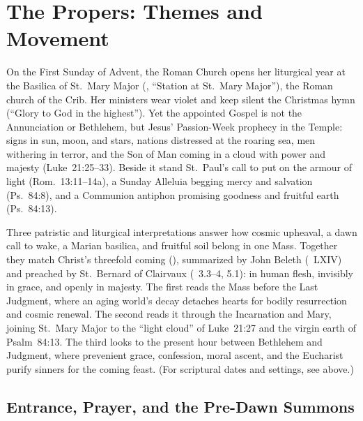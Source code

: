 \section{The Propers: Themes and Movement}

On the First Sunday of Advent, the Roman Church opens her liturgical year at the Basilica of St.~Mary Major (, ``Station at St.~Mary Major''), the Roman church of the Crib. Her ministers wear violet and keep silent the Christmas hymn  (``Glory to God in the highest''). Yet the appointed Gospel is not the Annunciation or Bethlehem, but Jesus' Passion-Week prophecy in the Temple: signs in sun, moon, and stars, nations distressed at the roaring sea, men withering in terror, and the Son of Man coming in a cloud with power and majesty (Luke~21:25--33). Beside it stand St.~Paul's call to put on the armour of light (Rom.~13:11--14a), a Sunday Alleluia begging mercy and salvation (Ps.~84:8), and a Communion antiphon promising goodness and fruitful earth (Ps.~84:13).

Three patristic and liturgical interpretations answer how cosmic upheaval, a dawn call to wake, a Marian basilica, and fruitful soil belong in one Mass. Together they match Christ's threefold coming (), summarized by John Beleth (~LXIV) and preached by St.~Bernard of Clairvaux (~3.3--4, 5.1): in human flesh, invisibly in grace, and openly in majesty. The first reads the Mass before the Last Judgment, where an aging world's decay detaches hearts for bodily resurrection and cosmic renewal. The second reads it through the Incarnation and Mary, joining St.~Mary Major to the ``light cloud'' of Luke~21:27 and the virgin earth of Psalm~84:13. The third looks to the present hour between Bethlehem and Judgment, where prevenient grace, confession, moral ascent, and the Eucharist purify sinners for the coming feast. (For scriptural dates and settings, see  above.)

\subsection{Entrance, Prayer, and the Pre-Dawn Summons}

